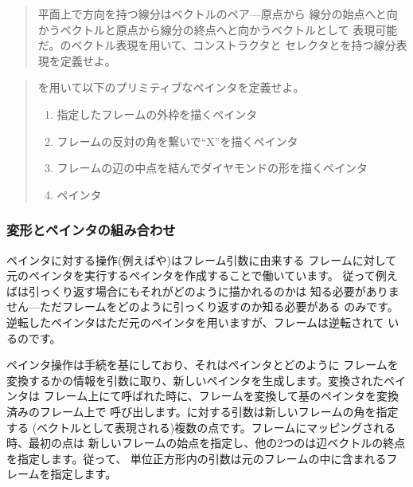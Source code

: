 \begin{quote}
平面上で方向を持つ線分はベクトルのペア---原点から
線分の始点へと向かうベクトルと原点から線分の終点へと向かうベクトルとして
表現可能だ。のベクトル表現を用いて、コンストラクタと
セレクタとを持つ線分表現を定義せよ。
\end{quote}

\begin{quote}
を用いて以下のプリミティブなペインタを定義せよ。

\begin{enumerate}[a]

\item
指定したフレームの外枠を描くペインタ

\item
フレームの反対の角を繋いで``X''を描くペインタ

\item
フレームの辺の中点を結んでダイヤモンドの形を描くペインタ

\item
{}ペインタ

\end{enumerate}
\end{quote}

\subsubsection*{変形とペインタの組み合わせ}



ペインタに対する操作(例えばや)はフレーム引数に由来する
フレームに対して元のペインタを実行するペインタを作成することで働いています。
従って例えばは引っくり返す場合にもそれがどのように描かれるのかは
知る必要がありません---ただフレームをどのように引っくり返すのか知る必要がある
のみです。逆転したペインタはただ元のペインタを用いますが、フレームは逆転されて
いるのです。



ペインタ操作は手続を基にしており、それはペインタとどのように
フレームを変換するかの情報を引数に取り、新しいペインタを生成します。変換されたペインタは
フレーム上にて呼ばれた時に、フレームを変換して基のペインタを変換済みのフレーム上で
呼び出します。に対する引数は新しいフレームの角を指定する
(ベクトルとして表現される)複数の点です。フレームにマッピングされる時、最初の点は
新しいフレームの始点を指定し、他の2つのは辺ベクトルの終点を指定します。従って、
単位正方形内の引数は元のフレームの中に含まれるフレームを指定します。

